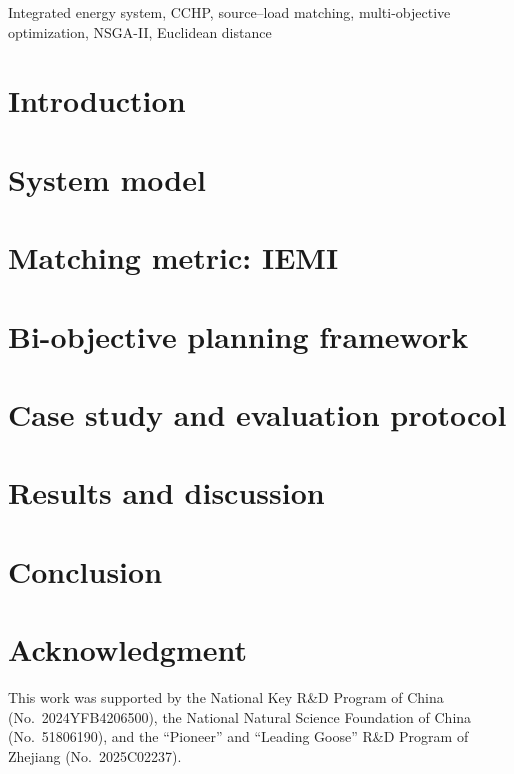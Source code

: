 \documentclass[conference]{IEEEtran}
\begin{document}
\begin{IEEEkeywords}
Integrated energy system, CCHP, source--load matching, multi-objective optimization, NSGA-II, Euclidean distance
\end{IEEEkeywords}

\section{Introduction}
\label{sec:intro}


\section{System model}
\label{sec:system}


\section{Matching metric: IEMI}
\label{sec:iemi}


\section{Bi-objective planning framework}
\label{sec:opt}


\section{Case study and evaluation protocol}
\label{sec:case}


\section{Results and discussion}
\label{sec:results}


\section{Conclusion}
\label{sec:conc}


\section*{Acknowledgment}
This work was supported by the National Key R\&D Program of China (No.~2024YFB4206500), the National Natural Science Foundation of China (No.~51806190), and the ``Pioneer'' and ``Leading Goose'' R\&D Program of Zhejiang (No.~2025C02237).



\end{document}
